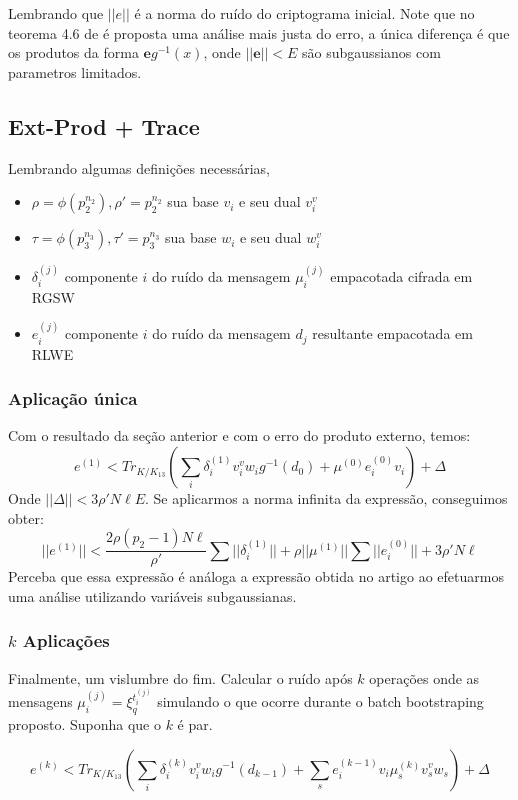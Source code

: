 Lembrando que $||e||$ é a norma do ruído do criptograma inicial. Note que no teorema 4.6 de \cite{lw23I} é proposta uma análise mais justa do erro, a única 
diferença é que os produtos da forma $\mathbf{e} g^{-1}(x)$, onde $||\mathbf{e}|| < E$ são subgaussianos com parametros limitados.

\subsection{Ext-Prod + Trace}
Lembrando algumas definições necessárias,

\begin{itemize}
    \item $\rho=\phi(p_2 ^{n_2}), \rho' = p_2 ^{n_2}$ sua base $v_i$ e seu dual $v_i^{v}$
    \item  $\tau=\phi(p_3 ^{n_3}), \tau' = p_3 ^{n_3}$ sua base $w_i$ e seu dual $w_i^{v}$
    \item $\delta_i^{(j)}$ componente $i$ do ruído da mensagem $\mu_i^{(j)}$ empacotada cifrada em RGSW 
    \item  $e_i^{(j)}$ componente $i$ do ruído da mensagem $d_j$ resultante empacotada em RLWE 
\end{itemize}
\subsubsection{Aplicação única}
Com o resultado da seção anterior e com o erro do produto externo, temos:
$$
e^{(1)} < Tr_{K / K_{13}}(\sum_i \delta_i^{(1)} v_i^v w_i g^{-1}(d_0) + \mu^{(0)} e_i^{(0)}v_i) +  \Delta
$$
Onde $||\Delta|| < 3 \rho'N\ell E$. Se aplicarmos a norma infinita da expressão, conseguimos obter:
$$
||e^{(1)}|| < \frac{2\rho (p_2-1)N\ell}{\rho'}\sum ||\delta_i^{(1)}|| + \rho ||\mu^{(1)}||\sum||e_i^{(0)}|| + 3 \rho'N\ell
$$
Perceba que essa expressão é análoga a expressão obtida no artigo ao efetuarmos uma análise utilizando variáveis subgaussianas.

\subsubsection{$k$ Aplicações}
Finalmente, um vislumbre do fim. Calcular o ruído após $k$ operações onde as mensagens $\mu_i^{(j)} = \xi_q^{t^{(j)}_i}$ simulando o que ocorre durante o batch 
bootstraping proposto. Suponha que o $k$ é par.

$$
e^{(k)} < Tr_{K / K_{13}}(\sum_i \delta_i^{(k)} v_i^v w_i g^{-1}(d_{k-1}) + \sum_s e_i^{(k-1)}v_i \mu_s^{(k)} v_s^v w_s) +  \Delta
$$

